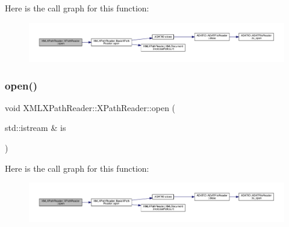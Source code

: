 Here is the call graph for this function\+:
\nopagebreak
\begin{figure}[H]
\begin{center}
\leavevmode
\includegraphics[width=350pt]{d3/d5a/classXMLXPathReader_1_1XPathReader_aa6e237582bcd20389d60cb29a879890c_cgraph}
\end{center}
\end{figure}
\mbox{\label{classXMLXPathReader_1_1XPathReader_aa9a57010ee8e71ac43da4388d622fe32}} 
\subsubsection{\texorpdfstring{open()}{open()}\hspace{0.1cm}{\footnotesize\ttfamily [3/6]}}
{\footnotesize\ttfamily void X\+M\+L\+X\+Path\+Reader\+::\+X\+Path\+Reader\+::open (\begin{DoxyParamCaption}\item[{std\+::istream \&}]{is }\end{DoxyParamCaption})\hspace{0.3cm}{\ttfamily [inline]}}

Here is the call graph for this function\+:
\nopagebreak
\begin{figure}[H]
\begin{center}
\leavevmode
\includegraphics[width=350pt]{d3/d5a/classXMLXPathReader_1_1XPathReader_aa9a57010ee8e71ac43da4388d622fe32_cgraph}
\end{center}
\end{figure}
\mbox{\label{classXMLXPathReader_1_1XPathReader_aa9a57010ee8e71ac43da4388d622fe32}} 
